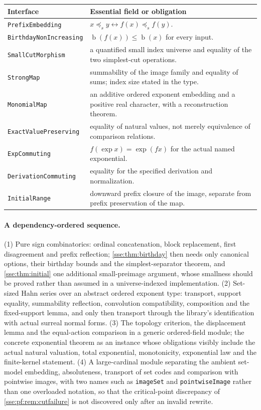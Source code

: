 \documentclass[11pt,a4paper]{article}
\numberwithin{equation}{section}
\theoremstyle{plain}
\theoremstyle{definition}
\theoremstyle{remark}
\newcommand{\bday}{\operatorname{b}}
\newcommand{\pref}{\preccurlyeq_s}
\newcommand{\code}[1]{\texttt{\small #1}}
\begin{document}
\begin{longtable}{P{48mm}P{100mm}}
\toprule
Interface & Essential field or obligation \\
\midrule
\endhead
\code{PrefixEmbedding} & $x\pref y\leftrightarrow f(x)\pref f(y)$. \\
\code{BirthdayNonIncreasing} & $\bday(f(x))\le\bday(x)$ for every input. \\
\code{SmallCutMorphism} & a quantified small index universe and equality of the two simplest-cut operations. \\
\code{StrongMap} & summability of the image family and equality of sums; index size stated in the type. \\
\code{MonomialMap} & an additive ordered exponent embedding and a positive real character, with a reconstruction theorem. \\
\code{ExactValuePreserving} & equality of natural values, not merely equivalence of comparison relations. \\
\code{ExpCommuting} & $f(\exp x)=\exp(fx)$ for the actual named exponential. \\
\code{DerivationCommuting} & equality for the specified derivation and normalization. \\
\code{InitialRange} & downward prefix closure of the image, separate from prefix preservation of the map. \\
\bottomrule
\end{longtable}

\paragraph{A dependency-ordered sequence.} (1) Pure sign combinatorics:
ordinal concatenation, block replacement, first disagreement and prefix
reflection; \cref{sse:thm:birthday} then needs only canonical options,
their birthday bounds and the simplest-separator theorem, and
\cref{sse:thm:initial} one additional small-preimage argument, whose
smallness should be proved rather than assumed in a universe-indexed
implementation. (2) Set-sized Hahn series over an abstract ordered exponent
type: transport, support equality, summability reflection, convolution
compatibility, composition and the fixed-support lemma, and only then
transport through the library's identification with actual surreal normal
forms. (3) The topology criterion, the displacement lemma and the
equal-action comparison in a generic ordered-field module; the concrete
exponential theorem as an instance whose obligations visibly include the
actual natural valuation, total exponential, monotonicity, exponential law
and the finite-kernel statement. (4) A large-cardinal module separating
the ambient set-model embedding, absoluteness, transport of set codes and
comparison with pointwise images, with two names such as
\code{imageSet} and \code{pointwiseImage} rather than one overloaded
notation, so that the critical-point discrepancy of
\cref{sse:pf:rem:cutfailure} is not discovered only after an invalid
rewrite.
\end{document}
